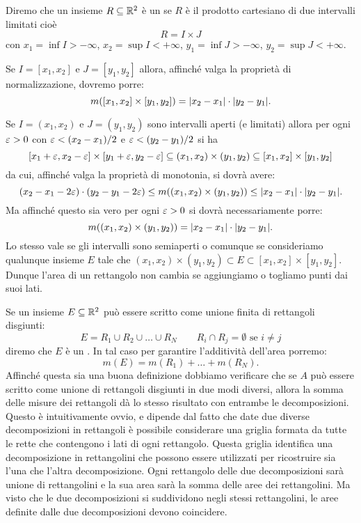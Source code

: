 Diremo che un insieme $R\subseteq \mathbb R^2$ è un
se $R$ è il prodotto cartesiano di due intervalli limitati
cioè
\[
  R = I\times J
\]
con $x_1=\inf I>-\infty$,
$x_2=\sup I<+\infty$,
$y_1=\inf J > -\infty$,
$y_2=\sup J < +\infty$.

Se $I=[x_1,x_2]$ e $J=[y_1,y_2]$ allora,
affinché valga la proprietà di normalizzazione,
dovremo porre:
\[
  m([x_1,x_2]\times[y_1,y_2]) = {\left|x_2-x_1\right|}\cdot{\left|y_2-y_1\right|}.
\]

Se $I=(x_1,x_2)$ e $J=(y_1,y_2)$ sono intervalli aperti (e limitati) allora
per ogni $\varepsilon>0$ con $\varepsilon<(x_2-x_1)/2$ e $\varepsilon<(y_2-y_1)/2$ si ha
\[
  [x_1+\varepsilon,x_2-\varepsilon] \times [y_1+\varepsilon,y_2-\varepsilon]
  \subseteq (x_1,x_2)\times (y_1,y_2)
  \subseteq [x_1,x_2]\times [y_1,y_2]
\]
da cui, affinché valga la proprietà di monotonia, si dovrà avere:
\[
  (x_2-x_1-2\varepsilon)\cdot (y_2-y_1-2\varepsilon) \le m((x_1,x_2)\times(y_1,y_2)) \le {\left|x_2-x_1\right|}\cdot {\left|y_2-y_1\right|}.
\]
Ma affinché questo sia vero per ogni $\varepsilon>0$ si dovrà necessariamente
porre:
\[
  m((x_1,x_2)\times(y_1,y_2)) = {\left|x_2-x_1\right|}\cdot{\left|y_2-y_1\right|}.
\]
Lo stesso vale se gli intervalli sono semiaperti o comunque
se consideriamo qualunque insieme $E$ tale che $(x_1,x_2)\times (y_1,y_2) \subset E \subset [x_1,x_2]\times[y_1,y_2]$.
Dunque l'area di un rettangolo non cambia se aggiungiamo o togliamo punti
dai suoi lati.

Se un insieme $E\subseteq \mathbb R^2$ può essere scritto come unione finita
di rettangoli disgiunti:
\[
  E = R_1 \cup R_2 \cup \dots \cup R_N
  \qquad
  R_i \cap R_j=\emptyset\text{ se } i\neq j
\]
diremo che $E$ è un .
In tal caso per garantire l'additività dell'area
porremo:
\[
  m(E) = m(R_1) + \dots + m(R_N).
\]
Affinché questa sia una buona definizione dobbiamo verificare che
se $A$ può essere scritto come unione di rettangoli disgiunti in due modi
diversi, allora la somma delle misure dei rettangoli dà lo stesso
risultato con entrambe le decomposizioni.
Questo è intuitivamente ovvio, e dipende dal fatto che date due
diverse decomposizioni in rettangoli è possibile considerare
una griglia formata da tutte le rette che contengono i lati di ogni rettangolo.
Questa griglia identifica una decomposizione in rettangolini che possono essere
utilizzati per ricostruire sia l'una che l'altra decomposizione.
Ogni rettangolo delle due decomposizioni sarà unione di rettangolini e la sua
area sarà la somma delle aree dei rettangolini. Ma visto che le due
decomposizioni si suddividono negli stessi rettangolini, le aree definite
dalle due decomposizioni devono coincidere.

